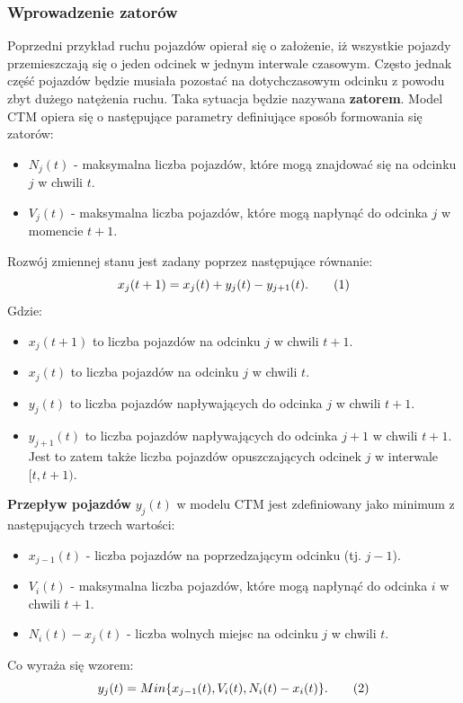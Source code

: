 \documentclass[12pt]{book}
\theoremstyle{plain}
\newcommand\addtag{\refstepcounter{equation}
\renewcommand{\labelenumii}{\theenumii}
\renewcommand{\theenumii}{\theenumi.\arabic{enumii}.}
\tag{\theequation}}
\begin{document}
\subsubsection*{Wprowadzenie zatorów}
Poprzedni przykład ruchu pojazdów opierał się o założenie, iż wszystkie pojazdy przemieszczają się o jeden odcinek w jednym interwale czasowym. Często jednak część pojazdów będzie musiała pozostać na dotychczasowym odcinku z powodu zbyt dużego natężenia ruchu. Taka sytuacja będzie nazywana \textbf{zatorem}. Model CTM opiera się o następujące parametry definiujące sposób formowania się zatorów:
\begin{itemize}
	\item $N_j(t)$ - maksymalna liczba pojazdów, które mogą znajdować się na odcinku $j$ w chwili $t$.
	\item $V_j(t)$ - maksymalna liczba pojazdów, które mogą napłynąć do odcinka $j$ w momencie $t+1$.
\end{itemize}
Rozwój zmiennej stanu jest zadany poprzez następujące równanie:
\[x_j(t+1)=x_j(t)+y_j(t)-y_{j+1}(t). \addtag \]
Gdzie:
\begin{itemize}
	\item $x_j(t+1)$ to liczba pojazdów na odcinku $j$ w chwili $t+1$.
	\item $x_j(t)$ to liczba pojazdów na odcinku $j$ w chwili $t$.
	\item $y_j(t)$ to liczba pojazdów napływających do odcinka $j$ w chwili $t+1$.
	\item $y_{j+1}(t)$ to liczba pojazdów napływających do odcinka $j+1$ w chwili $t+1$. Jest to zatem także liczba pojazdów opuszczających odcinek $j$ w interwale $[t,t+1)$.
\end{itemize}
\textbf{Przepływ pojazdów} $y_j(t)$ w modelu CTM jest zdefiniowany jako minimum z następujących trzech wartości:
\begin{itemize}
	\item $ x_{j-1}(t) $ - liczba pojazdów na poprzedzającym odcinku (tj. $j-1$).
	\item $ V_i(t) $ - maksymalna liczba pojazdów, które mogą napłynąć do odcinka $i$ w chwili $t+1$.
	\item $ N_i(t)-x_j(t) $ - liczba wolnych miejsc na odcinku $j$ w chwili $t$.
\end{itemize}
Co wyraża się wzorem:
\[
y_j(t)=Min\{x_{j-1}(t),V_i(t),N_i(t)-x_i(t)\}. \addtag \label{eq_y_CTM}
\]
\end{document}
